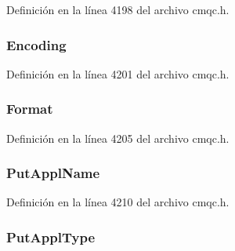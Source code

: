 Definición en la línea 4198 del archivo cmqc.\+h.

\hypertarget{structtag_m_q_d_l_h_a30167bf454a49a60fd3fe4e9e586af34}{}
\subsubsection[{Encoding}]{ Encoding}\label{structtag_m_q_d_l_h_a30167bf454a49a60fd3fe4e9e586af34}


Definición en la línea 4201 del archivo cmqc.\+h.

\hypertarget{structtag_m_q_d_l_h_a435a478822008713f8aaff89f369ed63}{}
\subsubsection[{Format}]{ Format}\label{structtag_m_q_d_l_h_a435a478822008713f8aaff89f369ed63}


Definición en la línea 4205 del archivo cmqc.\+h.

\hypertarget{structtag_m_q_d_l_h_a7195390be27f384ef0ab0d0f9053d462}{}
\subsubsection[{Put\+Appl\+Name}]{ Put\+Appl\+Name}\label{structtag_m_q_d_l_h_a7195390be27f384ef0ab0d0f9053d462}


Definición en la línea 4210 del archivo cmqc.\+h.

\hypertarget{structtag_m_q_d_l_h_a6d9e0e0fe9075017c939213948c747dc}{}
\subsubsection[{Put\+Appl\+Type}]{ Put\+Appl\+Type}\label{structtag_m_q_d_l_h_a6d9e0e0fe9075017c939213948c747dc}


